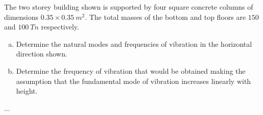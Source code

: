 
\begin{Exercise}[label={two_storey}]
The two storey building shown is supported by four square concrete columns of dimensions $0.35 \times 0.35\ m^2$. The total masses of the bottom and top floors are $150$ and $100\ Tn$ respectively.
\begin{enumerate}[(a)]
    \item Determine the natural modes and frequencies of vibration in the horizontal direction shown.
    \item Determine the frequency of vibration that would be obtained making the assumption that the fundamental mode of vibration increases linearly with height.
\end{enumerate}

\begin{center}
\end{center}

\shortAnswer ...
\end{Exercise}



\begin{Answer}[ref={two_storey}]
\end{Answer}
